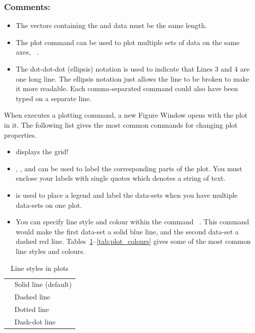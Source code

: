 \subsubsection{Comments:}
\begin{itemize}
\item The vectors containing the  and  data must be the same length.
\item The plot command can be used to plot multiple sets of data on the same axes, \ie\ .
\item The dot-dot-dot  (ellipsis) notation is used to indicate that Lines 3 and 4 are one long line. The ellipsis notation just allows the line to be broken to make it more readable. Each comma-separated command could also have been typed on a separate line. 
\end{itemize}
When \mlab executes a plotting command, a new Figure Window opens with the plot in it. The following list gives the most common commands for changing plot properties.
\begin{itemize}
\item {} displays the grid!
\item {}, , and  can be used to label the corresponding parts of the plot. You must enclose your labels with single quotes which denotes a string of text.
\item {} is used to place a legend and label the data-sets when you have multiple data-sets on one plot.
\item You can specify line style and colour within the  command \eg\ . This command would make the first data-set a solid blue line, and the second data-set a dashed red line. Tables~\ref{tab:plot_line_styles}--\ref{tab:plot_colours} gives some of the most common line styles and colours.
\end{itemize}

\begin{table}[h]
	\caption{Line styles in plots}
	\label{tab:plot_line_styles}
	\myfloatalign
	\begin{tabular}{ll}\toprule
	\spacedlowsmallcaps{String specifier} & \spacedlowsmallcaps{Line style}\\ \midrule
	\mcode{-} & Solid line (default) \\
	\mcode{--} & Dashed line \\
	\mcode{:} & Dotted line \\
	\mcode{-.} & Dash-dot line \\
	\bottomrule
	\end{tabular}
\end{table}

